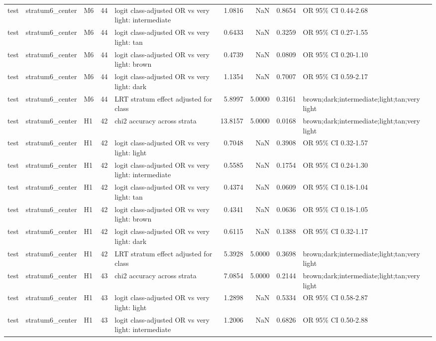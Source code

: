 \begin{tabular}{lllrlrrrl}
test & stratum6\_center & M6 & 44 & logit class-adjusted OR vs very light: intermediate & 1.0816 & NaN & 0.8654 & OR 95\% CI 0.44-2.68 \\
test & stratum6\_center & M6 & 44 & logit class-adjusted OR vs very light: tan & 0.6433 & NaN & 0.3259 & OR 95\% CI 0.27-1.55 \\
test & stratum6\_center & M6 & 44 & logit class-adjusted OR vs very light: brown & 0.4739 & NaN & 0.0809 & OR 95\% CI 0.20-1.10 \\
test & stratum6\_center & M6 & 44 & logit class-adjusted OR vs very light: dark & 1.1354 & NaN & 0.7007 & OR 95\% CI 0.59-2.17 \\
test & stratum6\_center & M6 & 44 & LRT stratum effect adjusted for class & 5.8997 & 5.0000 & 0.3161 & brown;dark;intermediate;light;tan;very light \\
test & stratum6\_center & H1 & 42 & chi2 accuracy across strata & 13.8157 & 5.0000 & 0.0168 & brown;dark;intermediate;light;tan;very light \\
test & stratum6\_center & H1 & 42 & logit class-adjusted OR vs very light: light & 0.7048 & NaN & 0.3908 & OR 95\% CI 0.32-1.57 \\
test & stratum6\_center & H1 & 42 & logit class-adjusted OR vs very light: intermediate & 0.5585 & NaN & 0.1754 & OR 95\% CI 0.24-1.30 \\
test & stratum6\_center & H1 & 42 & logit class-adjusted OR vs very light: tan & 0.4374 & NaN & 0.0609 & OR 95\% CI 0.18-1.04 \\
test & stratum6\_center & H1 & 42 & logit class-adjusted OR vs very light: brown & 0.4341 & NaN & 0.0636 & OR 95\% CI 0.18-1.05 \\
test & stratum6\_center & H1 & 42 & logit class-adjusted OR vs very light: dark & 0.6115 & NaN & 0.1388 & OR 95\% CI 0.32-1.17 \\
test & stratum6\_center & H1 & 42 & LRT stratum effect adjusted for class & 5.3928 & 5.0000 & 0.3698 & brown;dark;intermediate;light;tan;very light \\
test & stratum6\_center & H1 & 43 & chi2 accuracy across strata & 7.0854 & 5.0000 & 0.2144 & brown;dark;intermediate;light;tan;very light \\
test & stratum6\_center & H1 & 43 & logit class-adjusted OR vs very light: light & 1.2898 & NaN & 0.5334 & OR 95\% CI 0.58-2.87 \\
test & stratum6\_center & H1 & 43 & logit class-adjusted OR vs very light: intermediate & 1.2006 & NaN & 0.6826 & OR 95\% CI 0.50-2.88 \\

\end{tabular}

